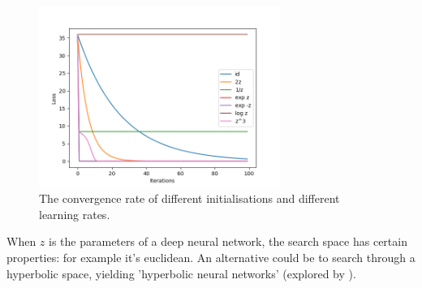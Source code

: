 \begin{figure}[h!]
\centering
\includegraphics[width=0.7\textwidth,height=0.35\textheight]{../../pictures/figures/reparam-mse-04.png}
\caption{The convergence rate of different initialisations and different learning rates.}
\end{figure}

When $z$ is the parameters of a deep neural network, the search space has certain properties: for example it's euclidean.
An alternative could be to search through a hyperbolic space, yielding 'hyperbolic neural networks' (explored by \cite{Ganea2018}).
